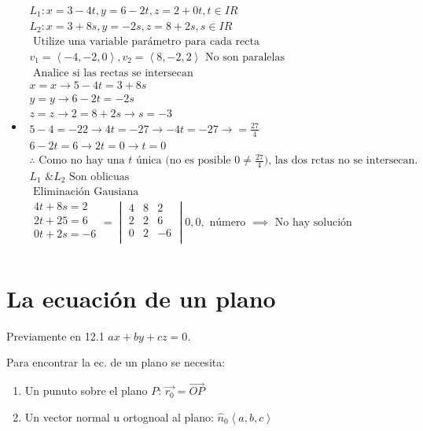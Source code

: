 \documentclass{article}
\begin{document}
\begin{itemize}
     \item \begin{align*}
        L_1:  x = 3-4t, y = 6-2t, z= 2+ 0t, t \in IR\\  
         L_2:  x = 3+ 8s, y = -2s, z = 8+2s, s \in IR \\ 
         \text{  Utilize una variable parámetro para cada recta  } \\ 
         v_1 = \left\langle -4,-2,0 \right\rangle , v_2 = \left\langle 8,-2,2 \right\rangle \text{  No son paralelas  } \\ 
         \text{  Analice si las rectas se intersecan  } \\ 
         x=x \rightarrow 5-4t=3+8s \\ 
         y=y \rightarrow 6-2t=-2s \\ 
         z=z \rightarrow 2 = 8 + 2s \rightarrow s = -3 \\ 
         5-4=-22 \rightarrow 4t=-27 \rightarrow -4t=-27 \rightarrow = \frac{27}{4} \\ 
         6-2t = 6 \rightarrow 2t = 0 \rightarrow t=0 \\ 
         \therefore \text{  Como no hay una $t$ única (no es posible $0 \neq \frac{27}{4} $), las dos rctas no se intersecan.  } \\ 
         L_1 \text{  \&  }L_2 \text{  Son oblicuas  } \\ 
         \text{  Eliminación Gausiana  } \\ 
         \begin{matrix}
             4t+8s = 2 \\ 
             2t+25 = 6 \\ 
             0t + 2s = -6 \\ 
         \end{matrix} = 
         \begin{vmatrix}
             4 & 8 & 2 \\ 
             2 & 2 & 6 \\ 
             0 & 2 & -6 \\ 
         \end{vmatrix} 
         0,0,\text{  número  } \implies \text{  No hay solución  } \\ 
     \end{align*}
\end{itemize}


\section{La ecuación de un plano}
Previamente en 12.1 $ax+by+cz = 0$.
\begin{figure}[htbp]
    \centering
    \caption{}
    \label{}
\end{figure}
Para encontrar la ec. de un plano se necesita:
    \begin{enumerate}
        \item Un punuto sobre el plano $P$: $\vec{r_0}=\overrightarrow{OP}$
        \item Un vector normal u ortognoal al plano: $\hat{n}_0 \left\langle a,b,c \right\rangle $
    \end{enumerate}
\end{document}
